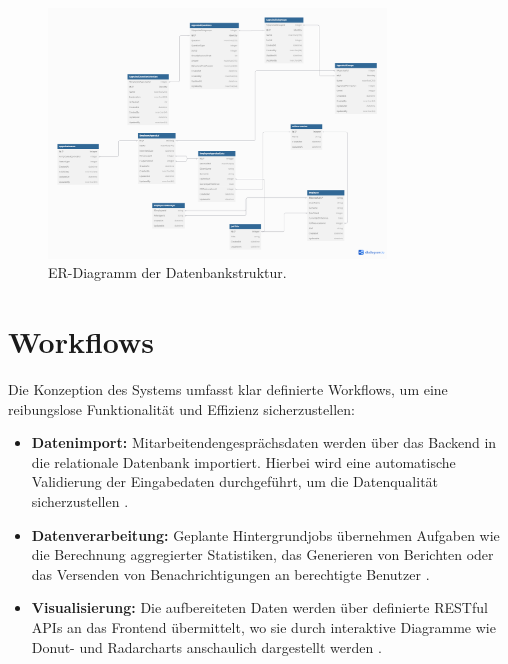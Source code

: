 \begin{figure}[h!]
    \centering
    \includegraphics[width=0.8\textwidth]{images/er_modell_design.png}
    \caption{ER-Diagramm der Datenbankstruktur.}
    \label{fig:db_er_model}
\end{figure}

\section{Workflows}
Die Konzeption des Systems umfasst klar definierte Workflows, um eine reibungslose Funktionalität und Effizienz sicherzustellen:
\begin{itemize}
    \item \textbf{Datenimport:} Mitarbeitendengesprächsdaten werden über das Backend in die relationale Datenbank importiert. Hierbei wird eine automatische Validierung der Eingabedaten durchgeführt, um die Datenqualität sicherzustellen \cite{gupta2020data, prat2021pipeline}.
    \item \textbf{Datenverarbeitung:} Geplante Hintergrundjobs übernehmen Aufgaben wie die Berechnung aggregierter Statistiken, das Generieren von Berichten oder das Versenden von Benachrichtigungen an berechtigte Benutzer \cite{hollingsworth2020workflow, apache2023workflow}.
    \item \textbf{Visualisierung:} Die aufbereiteten Daten werden über definierte RESTful APIs an das Frontend übermittelt, wo sie durch interaktive Diagramme wie Donut- und Radarcharts anschaulich dargestellt werden \cite{kirk2016data, evergreen2016effective}.
\end{itemize}


